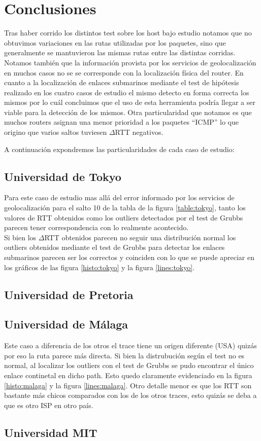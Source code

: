 \section{Conclusiones}

Tras haber corrido los distintos test sobre los host bajo estudio notamos que no obtuvimos variaciones en las rutas utilizadas por los paquetes, sino que generalmente se mantuvieron las mismas rutas entre las distintas corridas. 
Notamos también que la información provista por los servicios de geolocalización en muchos casos no se se corresponde con la localización física del router.
En cuanto a la localización de enlaces submarinos mediante el test de hipótesis realizado en los cuatro casos de estudio el mismo detecto en forma correcta los mismos por lo cuál concluimos que el uso de esta herramienta podría llegar a ser viable para la detección de los mismos.
Otra particularidad que notamos es que muchos routers asignan una menor prioridad a los paquetes ``ICMP'' lo que origino que varios saltos tuviesen $\Delta$RTT negativos.

A continuación expondremos las particularidades de cada caso de estudio:

\subsection{Universidad de Tokyo}

Para este caso de estudio mas allá del error informado por los servicios de geolocalización para el salto 10 de la tabla de la figura \ref{table:tokyo}, tanto los valores de RTT obtenidos como los outliers detectados por el test de Grubbs parecen tener correspondencia con lo realmente acontecido.\\
Si bien los $\Delta$RTT obtenidos parecen no seguir una distribución normal los outliers obtenidos mediante el test de Grubbs para detectar los enlaces submarinos parecen ser los correctos y coinciden con lo que se puede apreciar en los gráficos de las figura \ref{histo:tokyo} y la figura \ref{lines:tokyo}.

\subsection{Universidad de Pretoria}

\subsection{Universidad de Málaga}
Este caso a diferencia de los otros el trace tiene un origen diferente (USA) quizás por eso la ruta parece más directa.
Si bien la distrubución según el test no es normal, al localizar los outliers con el test de Grubbs se pudo encontrar el único enlace continetal en dicho path. Esto quedo claramente evidenciado en la figura \ref{histo:malaga} y la figura \ref{lines:malaga}.
Otro detalle menor es que los RTT son bastante más chicos comparados con los de los otros traces, esto quizás se deba a que es otro ISP en otro país.



\subsection{Universidad MIT}
